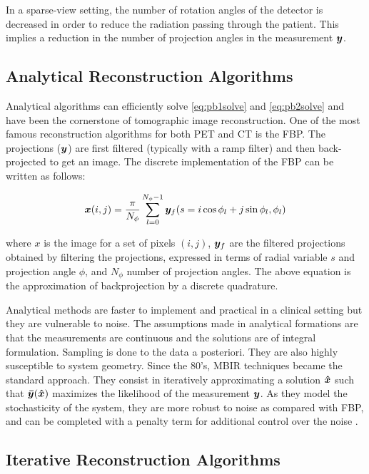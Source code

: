 In a sparse-view setting, the number of rotation angles of the detector is decreased in order to reduce the radiation passing through the patient. This implies a reduction in the number of projection angles in the measurement $\bm{y}$.


\subsection{Analytical Reconstruction Algorithms}
Analytical algorithms can efficiently solve \eqref{eq:pb1solve} and \eqref{eq:pb2solve} and have been the cornerstone of tomographic image reconstruction. One of the most famous reconstruction algorithms for both \ac{PET} and \ac{CT} is the \ac{FBP}. The projections ($\bm{y}$) are first filtered (typically with a ramp filter) and then back-projected to get an image. The discrete implementation of the \ac{FBP} can be written as follows:

\begin{equation}\label{eq:FBP}
	\bm{x}(i,j) = \frac{\pi}{N_\phi}\sum_{l=0}^{N_\phi-1}\bm{y}_f(s=i\cos\phi_l+j\sin\phi_l,\phi_l)
\end{equation}

where $x$ is the image for a set of pixels $(i,j)$, $\bm{y}_f$ are the filtered projections obtained by filtering the projections, expressed in terms of radial variable $s$ and projection angle $\phi$, and $N_\phi$ number of projection angles. The above equation is the approximation of backprojection by a discrete quadrature. 

Analytical methods are faster to implement and practical in a clinical setting but they are vulnerable to noise. The assumptions made in analytical formations are that the measurements are continuous and the solutions are of integral formulation. Sampling is done to the data a posteriori. They are also highly susceptible to system geometry. Since the 80's, \ac{MBIR} techniques \cite{Shepp1982,fessler2000statistical} became the standard approach. They consist in iteratively approximating a solution $\bm{\hat{x}}$ such that $\bm{\bar{y}}(\bm{\hat{x}})$ maximizes the likelihood of the measurement $\bm{y}$. As they model the stochasticity of the system, they are more robust to noise as compared with \ac{FBP}, and can be completed with a penalty term for additional control over the noise \cite{depierro1995}. 
\subsection{Iterative Reconstruction Algorithms}

